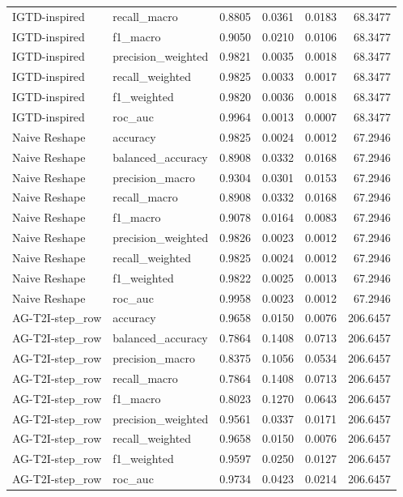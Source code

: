 \begin{tabular}{llrrrr}
IGTD-inspired & recall_macro & 0.8805 & 0.0361 & 0.0183 & 68.3477 \\
IGTD-inspired & f1_macro & 0.9050 & 0.0210 & 0.0106 & 68.3477 \\
IGTD-inspired & precision_weighted & 0.9821 & 0.0035 & 0.0018 & 68.3477 \\
IGTD-inspired & recall_weighted & 0.9825 & 0.0033 & 0.0017 & 68.3477 \\
IGTD-inspired & f1_weighted & 0.9820 & 0.0036 & 0.0018 & 68.3477 \\
IGTD-inspired & roc_auc & 0.9964 & 0.0013 & 0.0007 & 68.3477 \\
Naive Reshape & accuracy & 0.9825 & 0.0024 & 0.0012 & 67.2946 \\
Naive Reshape & balanced_accuracy & 0.8908 & 0.0332 & 0.0168 & 67.2946 \\
Naive Reshape & precision_macro & 0.9304 & 0.0301 & 0.0153 & 67.2946 \\
Naive Reshape & recall_macro & 0.8908 & 0.0332 & 0.0168 & 67.2946 \\
Naive Reshape & f1_macro & 0.9078 & 0.0164 & 0.0083 & 67.2946 \\
Naive Reshape & precision_weighted & 0.9826 & 0.0023 & 0.0012 & 67.2946 \\
Naive Reshape & recall_weighted & 0.9825 & 0.0024 & 0.0012 & 67.2946 \\
Naive Reshape & f1_weighted & 0.9822 & 0.0025 & 0.0013 & 67.2946 \\
Naive Reshape & roc_auc & 0.9958 & 0.0023 & 0.0012 & 67.2946 \\
AG-T2I-step_row & accuracy & 0.9658 & 0.0150 & 0.0076 & 206.6457 \\
AG-T2I-step_row & balanced_accuracy & 0.7864 & 0.1408 & 0.0713 & 206.6457 \\
AG-T2I-step_row & precision_macro & 0.8375 & 0.1056 & 0.0534 & 206.6457 \\
AG-T2I-step_row & recall_macro & 0.7864 & 0.1408 & 0.0713 & 206.6457 \\
AG-T2I-step_row & f1_macro & 0.8023 & 0.1270 & 0.0643 & 206.6457 \\
AG-T2I-step_row & precision_weighted & 0.9561 & 0.0337 & 0.0171 & 206.6457 \\
AG-T2I-step_row & recall_weighted & 0.9658 & 0.0150 & 0.0076 & 206.6457 \\
AG-T2I-step_row & f1_weighted & 0.9597 & 0.0250 & 0.0127 & 206.6457 \\
AG-T2I-step_row & roc_auc & 0.9734 & 0.0423 & 0.0214 & 206.6457 \\

\end{tabular}
